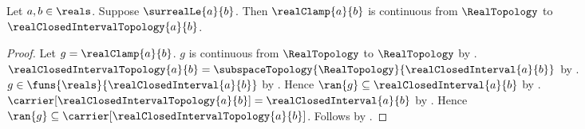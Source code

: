 \begin{theorem}\label{real_clamp_continuous_to_closed_interval}
    Let $a,b\in\reals$.
    Suppose $\surrealLe{a}{b}$.
    Then $\realClamp{a}{b}$ is continuous from $\RealTopology$ to
        $\realClosedIntervalTopology{a}{b}$.
\end{theorem}
\begin{proof}
    Let $g=\realClamp{a}{b}$.
    $g$ is continuous from $\RealTopology$ to $\RealTopology$
        by .
    $\realClosedIntervalTopology{a}{b}
        =\subspaceTopology{\RealTopology}{\realClosedInterval{a}{b}}$
        by .
    $g\in\funs{\reals}{\realClosedInterval{a}{b}}$
        by .
    Hence $\ran{g}\subseteq\realClosedInterval{a}{b}$
        by .
    $\carrier[\realClosedIntervalTopology{a}{b}]
        =\realClosedInterval{a}{b}$
        by .
    Hence
        $\ran{g}\subseteq\carrier[\realClosedIntervalTopology{a}{b}]$.
    Follows by .
\end{proof}
